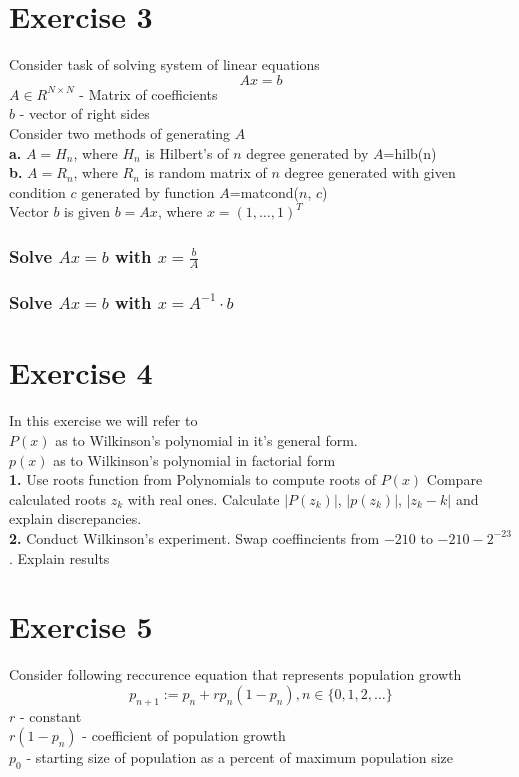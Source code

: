 \documentclass[12pt]{article}
\begin{document}
\section*{Exercise 3}
Consider task of solving system of linear equations
\begin{equation*}
    Ax = b
\end{equation*}
$A \in R^{N \times N}$ - Matrix of coefficients\\
$b$ - vector of right sides\\
Consider two methods of generating $A$\\
\textbf{a.} 
$A = H_n$, where $H_n$ is Hilbert's of $n$ degree generated by $A$=hilb(n)\\
\textbf{b.} 
$A = R_n$, where $R_n$ is random matrix of $n$ degree generated 
with given condition $c$ generated by function $A$=matcond($n$, $c$)\\
Vector $b$ is given $b = Ax$, where $x = (1,\dots,1)^T$
\subsubsection*{Solve $Ax = b$ with $x = \frac{b}{A}$}
\subsubsection*{Solve $Ax = b$ with $x = A^{-1} \cdot b$}

\section*{Exercise 4}
In this exercise we will refer to\\ 
$P(x)$ as to Wilkinson's polynomial in it's general form.\\
$p(x)$ as to Wilkinson's polynomial in factorial form\\
\textbf{1.} Use roots function from Polynomials to compute roots of $P(x)$
Compare calculated roots $z_k$ with real ones. Calculate $|P(z_k)|$, $|p(z_k)|$, $|z_k - k|$ and explain discrepancies.\\
\textbf{2.} Conduct Wilkinson's experiment. Swap coeffincients from $-210$ to $-210-2^{-23}$. Explain results
\section*{Exercise 5}
Consider following reccurence equation that represents population growth
\begin{equation}
    p_{n+1} := p_n + rp_n(1-p_n), n \in \{0, 1, 2, \dots\}
\end{equation}
    $r$ - constant\\
    $r(1-p_n)$ - coefficient of population growth\\
    $p_0$ - starting size of population as a percent of maximum population size
\end{document}
